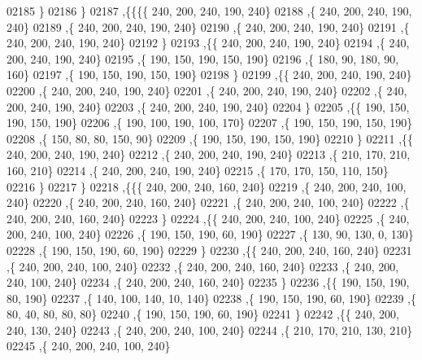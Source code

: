 \begin{DoxyCode}
02185    \}
02186   \}
02187  ,\{\{\{\{   240,   200,   240,   190,   240\}
02188     ,\{   240,   200,   240,   190,   240\}
02189     ,\{   240,   200,   240,   190,   240\}
02190     ,\{   240,   200,   240,   190,   240\}
02191     ,\{   240,   200,   240,   190,   240\}
02192     \}
02193    ,\{\{   240,   200,   240,   190,   240\}
02194     ,\{   240,   200,   240,   190,   240\}
02195     ,\{   190,   150,   190,   150,   190\}
02196     ,\{   180,    90,   180,    90,   160\}
02197     ,\{   190,   150,   190,   150,   190\}
02198     \}
02199    ,\{\{   240,   200,   240,   190,   240\}
02200     ,\{   240,   200,   240,   190,   240\}
02201     ,\{   240,   200,   240,   190,   240\}
02202     ,\{   240,   200,   240,   190,   240\}
02203     ,\{   240,   200,   240,   190,   240\}
02204     \}
02205    ,\{\{   190,   150,   190,   150,   190\}
02206     ,\{   190,   100,   190,   100,   170\}
02207     ,\{   190,   150,   190,   150,   190\}
02208     ,\{   150,    80,    80,   150,    90\}
02209     ,\{   190,   150,   190,   150,   190\}
02210     \}
02211    ,\{\{   240,   200,   240,   190,   240\}
02212     ,\{   240,   200,   240,   190,   240\}
02213     ,\{   210,   170,   210,   160,   210\}
02214     ,\{   240,   200,   240,   190,   240\}
02215     ,\{   170,   170,   150,   110,   150\}
02216     \}
02217    \}
02218   ,\{\{\{   240,   200,   240,   160,   240\}
02219     ,\{   240,   200,   240,   100,   240\}
02220     ,\{   240,   200,   240,   160,   240\}
02221     ,\{   240,   200,   240,   100,   240\}
02222     ,\{   240,   200,   240,   160,   240\}
02223     \}
02224    ,\{\{   240,   200,   240,   100,   240\}
02225     ,\{   240,   200,   240,   100,   240\}
02226     ,\{   190,   150,   190,    60,   190\}
02227     ,\{   130,    90,   130,     0,   130\}
02228     ,\{   190,   150,   190,    60,   190\}
02229     \}
02230    ,\{\{   240,   200,   240,   160,   240\}
02231     ,\{   240,   200,   240,   100,   240\}
02232     ,\{   240,   200,   240,   160,   240\}
02233     ,\{   240,   200,   240,   100,   240\}
02234     ,\{   240,   200,   240,   160,   240\}
02235     \}
02236    ,\{\{   190,   150,   190,    80,   190\}
02237     ,\{   140,   100,   140,    10,   140\}
02238     ,\{   190,   150,   190,    60,   190\}
02239     ,\{    80,    40,    80,    80,    80\}
02240     ,\{   190,   150,   190,    60,   190\}
02241     \}
02242    ,\{\{   240,   200,   240,   130,   240\}
02243     ,\{   240,   200,   240,   100,   240\}
02244     ,\{   210,   170,   210,   130,   210\}
02245     ,\{   240,   200,   240,   100,   240\}

\end{DoxyCode}
